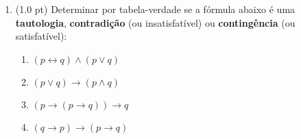 \documentclass[12pt]{article}
\begin{document}
\begin{enumerate}

\begin{comment}
\item (1.0 pt) Determina o valor lógico das fórmulas abaixo:

\begin{itemize}
\setlength{\itemsep}{-3pt}
\item $-2 < 0 \leftrightarrow \pi^2 < 0 \wedge $ Roma é a capital da Itália
\item $3+4=7 \vee 13 $ é um número primo $\rightarrow \sqrt 16 > 2$
\item $3^2 + 4^2 = 5^2  ~\wedge $ Tóquio não fica no Japão $\rightarrow ( \pi > 2.04 \leftrightarrow 2 \neq 3 )$
\item Na Espanha se fala português $\wedge~ 2^3 - 4 > 5^2 - 10 \vee 5 \neq 3+3$
\end{itemize}
\end{comment}

\item (1.0 pt) Determinar por tabela-verdade se a fórmula abaixo é uma {\bf tautologia}, {\bf contradição} (ou insatisfatível) ou {\bf contingência} (ou satisfatível): 

\begin{enumerate}
\setlength{\itemsep}{-5pt}

\item $(p \leftrightarrow q) \wedge (p \vee q)$

\item $(p \vee q)\rightarrow (p \wedge  q)$


\item $(p \rightarrow (p \rightarrow q)) \rightarrow  q $

\item $(q \rightarrow p) \rightarrow (p  \rightarrow q )$
\end{enumerate}

%
%
%
%
%
%



\end{enumerate}
\end{document}

